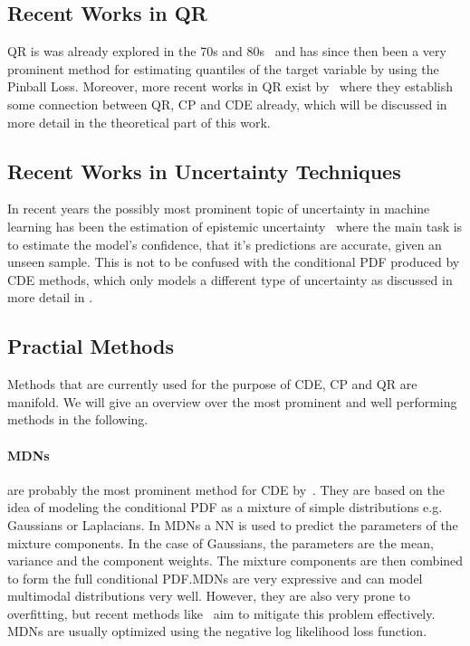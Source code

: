 \subsection{Recent Works in QR}

QR is was already explored in the 70s and 80s~\cite{koenker1978regression} and has since then been a very prominent method for estimating quantiles of the target variable by using the Pinball Loss. Moreover, more recent works in QR exist by~\cite{chung2020beyond} where they establish some connection between QR, CP and CDE already, which will be discussed in more detail in the theoretical part of this work.

\subsection{Recent Works in Uncertainty Techniques}

In recent years the possibly most prominent topic of uncertainty in machine learning has been the estimation of epistemic uncertainty~\cite{barber1998ensemble, neal2012bayesian, gal_dropout_2016,schweighofer2023quantification, gawlikowski2023survey} where the main task is to estimate the model's confidence, that it's predictions are accurate, given an unseen sample. This is not to be confused with the conditional PDF produced by CDE methods, which only models a different type of uncertainty as discussed in more detail in .

\subsection{Practial Methods}
Methods that are currently used for the purpose of CDE, CP and QR are manifold. We will give an overview over the most prominent and well performing methods in the following.

\paragraph{MDNs} are probably the most prominent method for CDE by~\cite{bishop1994mixture}. They are based on the idea of modeling the conditional PDF as a mixture of simple distributions e.g. Gaussians or Laplacians. In MDNs a NN is used to predict the parameters of the mixture components. In the case of Gaussians, the parameters are the mean, variance and the component weights. The mixture components are then combined to form the full conditional PDF.\@ MDNs are very expressive and can model multimodal distributions very well. However, they are also very prone to overfitting, but recent methods like~\cite{rothfuss2019noise} aim to mitigate this problem effectively. MDNs are usually optimized using the negative log likelihood loss function.

